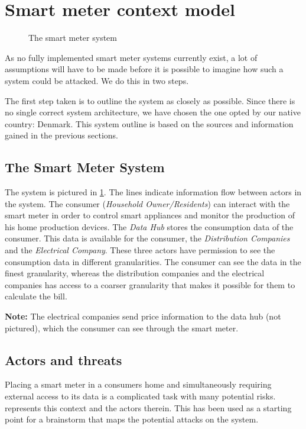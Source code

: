 \section{Smart meter context model}\label{sec:smartmetercontext}

\begin{figure}[h]
  
  \caption{The smart meter system\cite{tdlm}}
  \label{contextual:system}
\end{figure}

As no fully implemented smart meter systems currently exist, a lot of assumptions will have to be made before it is possible to imagine how such a system could be attacked.
We do this in two steps.

The first step taken is to outline the system as closely as possible.
Since there is no single correct system architecture, we have chosen the one opted by our native country: Denmark.
This system outline is based on the sources and information gained in the previous sections.

\subsection{The Smart Meter System}
The system is pictured in \cref{contextual:system}.
The lines indicate information flow between actors in the system.
The consumer (\textit{Household Owner/Residents}) can interact with the smart meter in order to control smart appliances and monitor the production of his home production devices.
The \textit{Data Hub} stores the consumption data of the consumer.
This data is available for the consumer, the \textit{Distribution Companies} and the \textit{Electrical Company}.
These three actors have permission to see the consumption data in different granularities.
The consumer can see the data in the finest granularity, whereas the distribution companies and the electrical companies has access to a coarser granularity that makes it possible for them to calculate the bill.

\textbf{Note:} The electrical companies send price information to the data hub (not pictured), which the consumer can see through the smart meter.

\subsection{Actors and threats}
Placing a smart meter in a consumers home and simultaneously requiring external access to its data is a complicated task with many potential risks.
 represents this context and the actors therein.
This has been used as a starting point for a brainstorm that maps the potential attacks on the system.

